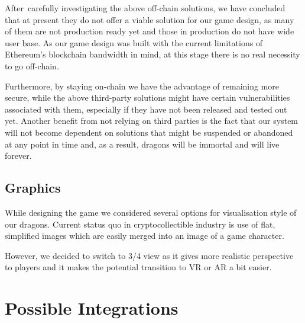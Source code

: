 \documentclass[12pt]{article}
\begin{document}
\vspace{\baselineskip}
After\ carefully investigating the above off-chain solutions, we have concluded that at present they do not offer a viable solution for our game design, as many of them are not production ready yet and those in production do not have wide user base. As our game design was built with the current limitations of Ethereum’s blockchain bandwidth in mind, at this stage there is no real necessity to go off-chain. \par

Furthermore, by staying on-chain we have the advantage of remaining more secure, while the above third-party solutions might have certain vulnerabilities associated with them, especially if they have not been released and tested out yet. Another benefit from not relying on third parties is the fact that our system will not become dependent on solutions that might be suspended or abandoned at any point in time and, as a result, dragons will be immortal and will live forever. \par




\vspace{\baselineskip}\subsection{Graphics}
  \label{Graphics}  \par

While designing the game we considered several options for visualisation style of our dragons. Current status quo in cryptocollectible industry is  use of flat, simplified images which are easily merged into an image of a game character.\par

However, we decided to switch to 3/4 view as it gives more realistic perspective to players and it makes the potential transition to VR or AR a bit easier.


\newpage
\par

\section{Possible Integrations}
 \label{Possible Integrations}  \par
\end{document}
